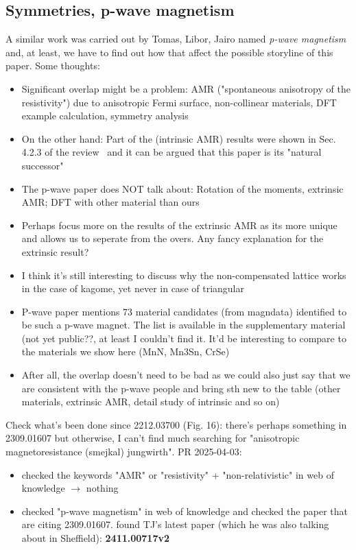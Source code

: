 \documentclass[prb,showpacs,amsmath,amssymb,superscriptaddress,twocolumn,floatfix]{revtex4-1}
\begin{document}


\subsection{{\color{red} Symmetries, p-wave magnetism}}
{\color{red} A similar work was carried out by Tomas, Libor, Jairo named \textit{p-wave magnetism}~\cite{BirkHellenes:2023} and, at least, we have to find out how that affect the possible storyline of this paper. Some thoughts:

\begin{itemize}
	\item Significant overlap might be a problem: AMR ("spontaneous anisotropy of the resistivity") due to anisotropic Fermi surface, non-collinear materials, DFT example calculation, symmetry analysis
	\item On the other hand: Part of the (intrinsic AMR) results were shown in Sec. 4.2.3 of the review~\cite{Ritzinger:2023} and it can be argued that this paper is its "natural successor"
	\item The p-wave paper does NOT talk about: Rotation of the moments, extrinsic AMR; DFT with other material than ours
	\item Perhaps focus more on the results of the extrinsic AMR as its more unique and allows us to seperate from the overs. Any fancy explanation for the extrinsic result?
	\item I think it's still interesting to discuss why the non-compensated lattice works in the case of kagome, yet never in case of triangular
	\item P-wave paper mentions 73 material candidates (from magndata) identified to be such a p-wave magnet. The list is available in the supplementary material (not yet public??, at least I couldn't find it. It'd be interesting to compare to the materials we show here (MnN, Mn3Sn, CrSe)
	\item After all, the overlap doesn't need to be bad as we could also just say that we are consistent with the p-wave people and bring sth new to the table (other materials, extrinsic AMR, detail study of intrinsic and so on)
\end{itemize}
}

{\color{red} Check what's been done since 2212.03700
	(Fig. 16): there's perhaps something in 2309.01607 but otherwise, I can't find much searching for "anisotropic magnetoresistance (smejkal) jungwirth". PR 2025-04-03:
		
\begin{itemize}
	\item checked the keywords "AMR" or "resistivity" + "non-relativistic" in web of knowledge $\rightarrow$ nothing
	\item checked "p-wave magnetism" in web of knowledge and checked the paper that are citing 2309.01607. found TJ's latest paper (which he was also talking about in Sheffield): \textbf{2411.00717v2}
\end{itemize}	
	}
\end{document}
